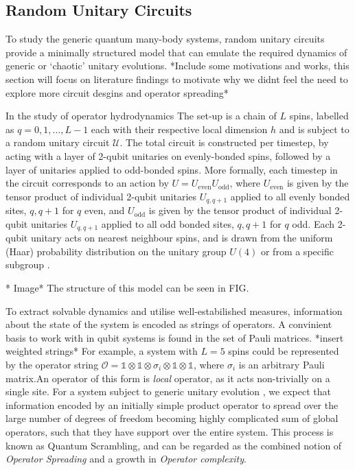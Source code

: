 \subsection{Random Unitary Circuits}
To study the generic quantum many-body systems, random unitary circuits provide a minimally structured model that can emulate the required dynamics of generic or `chaotic' unitary evolutions. *Include some motivations and works, this section will focus on literature findings to motivate why we didnt feel the need to explore more circuit desgins and operator spreading* 

In the study of operator hydrodynamics The set-up is a chain of $L$ spins, labelled as $q = 0, 1, \dots, L-1$ each with their respective local dimension $h$ and is subject to a random unitary circuit $\mathcal{U}$. The total circuit is constructed per timestep, by acting with a layer of 2-qubit unitaries on evenly-bonded spins, followed by a layer of unitaries applied to odd-bonded spins. More formally, each timestep in the circuit corresponds to an action by $U = U_{\text{even}} U_{\text{odd}}$, where $U_{\text{even}}$ is given by the tensor product of individual 2-qubit unitaries $U_{q, q+1}$ applied to all evenly bonded sites, $q, q+1$ for $q$ even,  and $U_{\text{odd}}$ is given by the tensor product of individual 2-qubit unitaries $U_{q, q+1}$ applied to all odd bonded sites, $q, q+1$ for $q$ odd. Each 2-qubit unitary acts on nearest neighbour spins, and is drawn from the uniform (Haar) probability distribution on the unitary group $U(4)$ or from a specific subgroup \cite{hunterjones2018operator}.

 


* Image* The structure of this model can be seen in FIG. 




To extract solvable dynamics and utilise well-estabilished measures, information about the state of the system is encoded as strings of operators. A convinient basis to work with in qubit systems is found in the set of Pauli matrices. *insert weighted strings*
For example, a system with $L = 5$ spins could be represented by the operator string $\mathcal{O} = \mathbb{1} \otimes \mathbb{1} \otimes \sigma_{i} \otimes \mathbb{1} \otimes \mathbb{1}$, where $\sigma_{i}$ is an arbitrary Pauli matrix.An operator of this form is \textit{local} operator, as it acts non-trivially on a single site. 
For a system subject to generic unitary evolution , we expect that information encoded by an initially simple product operator to spread over the large number of degrees of freedom becoming highly complicated sum of global operators, such that they have support over the entire system. This process is known as Quantum Scrambling, and can be regarded as the combined notion of \textit{Operator Spreading} and a growth in \textit{Operator complexity}. 

